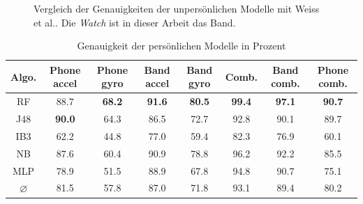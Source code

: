 \begin{figure}
	\centering
	\caption[Vergleich der Genauigkeiten der unpersönlichen Modelle mit Weiss et al.\cite{Weiss2016}]{Vergleich der Genauigkeiten der unpersönlichen Modelle mit Weiss et al.\cite{Weiss2016}. Die \textit{Watch} ist in dieser Arbeit das Band.}
	\label{fig:accuracy-impersonal-vs-weiss}
\end{figure}

\begin{table}
\centering
\begin{tabular}{|c|c|c|c|c|c|c|c|}
	\hline 
	\textbf{Algo.} & \textbf{Phone accel} & \textbf{Phone gyro} & \textbf{Band accel} & \textbf{Band gyro} & \textbf{Comb.} & \textbf{Band comb.} & \textbf{Phone comb.} \\ 
	\hline 
	RF & 88.7 & \textbf{68.2} & \textbf{91.6} & \textbf{80.5} & \textbf{99.4} & \textbf{97.1} & \textbf{90.7} \\ 
	J48 & \textbf{90.0} & 64.3 & 86.5 & 72.7 & 92.8 & 90.1 & 89.7 \\ 
	IB3 & 62.2 & 44.8 & 77.0 & 59.4 & 82.3 & 76.9 & 60.1 \\ 
	NB & 87.6 & 60.4 & 90.9 & 78.8 & 96.2 & 92.2 & 85.5 \\ 
	MLP & 78.9 & 51.5 & 88.9 & 67.8 & 94.8 & 90.7 & 75.1 \\ 
	\hline 
	$\varnothing$ & 81.5 & 57.8 & 87.0 & 71.8 & 93.1 & 89.4 & 80.2 \\ 
	\hline 
\end{tabular}
\caption{Genauigkeit der persönlichen Modelle in Prozent}
\label{tab:accuracy-personal}
\end{table}

